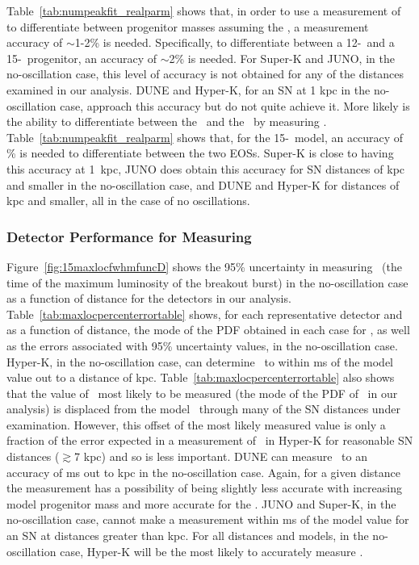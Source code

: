 Table~\ref{tab:numpeakfit_realparm} shows that, 
 in order to use a measurement of \lmax to 
differentiate between progenitor masses assuming the \ls, a
measurement accuracy of $\sim$1-2\% is needed.  Specifically, to
differentiate between a 12-\Msol\ and a 15-\Msol\ progenitor, an
accuracy of $\sim$2\% is needed.  For Super-K and JUNO, in the
 no-oscillation case, this level of
accuracy is not obtained for any of the distances examined in our
analysis.  DUNE and Hyper-K, for an SN at 1 kpc in 
the no-oscillation case, 
approach this accuracy but do not quite achieve it. 
More likely is the ability to
differentiate between the \ls\ and the \shen\ by measuring \lmax.
Table~\ref{tab:numpeakfit_realparm} shows that, for the
15-\Msol\ model, an accuracy of \% is needed to differentiate
between the two EOSs.  Super-K is close to having this
 accuracy at 1~kpc, JUNO does
obtain this accuracy for SN distances of  kpc and smaller
 in the no-oscillation case, and 
DUNE and Hyper-K for distances of  kpc and smaller, 
all in the case of no oscillations.  




\subsubsection{Detector Performance for Measuring \tmax}
Figure~\ref{fig:15maxlocfwhmfuncD} shows the  95\% uncertainty in
measuring \tmax\ (the time of the maximum luminosity of the breakout
burst) in the no-oscillation case as a function of 
distance for the detectors in our
analysis.  
Table~\ref{tab:maxlocpercenterrortable} shows, for each representative
detector and as a function of distance, the mode of the PDF obtained
in each case for \tmax, as well as the 
errors associated with 95\% uncertainty values, in the no-oscillation case.
Hyper-K, in the no-oscillation case,  can
determine \tmax\ to within  ms of the model value out to a
distance of  kpc.  
Table~\ref{tab:maxlocpercenterrortable} also shows that the value of
\tmax\ most likely to be measured (the mode of the PDF of \tmax\ in our
analysis) is displaced from the model \tmax\  through many of the 
SN distances under examination.  
However, this offset of the most likely measured value is
only a fraction of the error expected in a measurement of \tmax\ in
Hyper-K for reasonable SN distances ($\gtrsim$7 kpc) 
and so is less important.  
DUNE can measure \tmax\ to an 
accuracy of  ms out to  kpc in the no-oscillation case.  
Again, for a
given distance the measurement has a possibility of being 
slightly less accurate with
increasing model progenitor mass and more accurate for the \shen.  
JUNO and Super-K, in the no-oscillation case,  
cannot make a measurement within  ms of the
model value for an SN at distances greater 
than  kpc.  For all distances and
models, in the no-oscillation case, 
Hyper-K will be the most likely to accurately measure \tmax.

